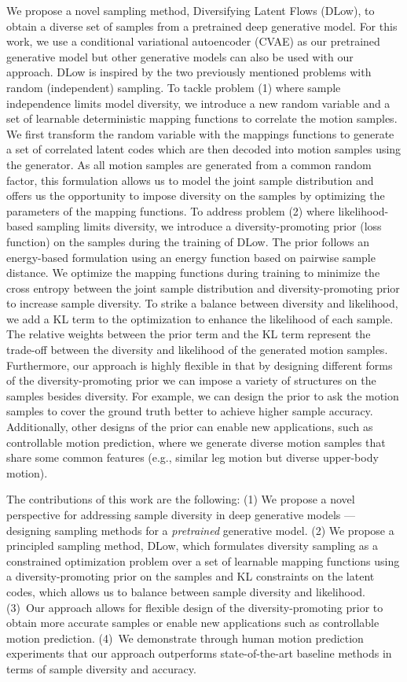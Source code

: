 \documentclass[runningheads]{llncs}
\begin{document}
	We propose a novel sampling method, Diversifying Latent Flows (DLow), to obtain a diverse set of samples from a pretrained deep generative model. For this work, we use a conditional variational autoencoder (CVAE) as our pretrained generative model but other generative models can also be used with our approach. DLow is inspired by the two previously mentioned problems with random (independent) sampling. To tackle problem (1) where sample independence limits model diversity, we introduce a new random variable and a set of learnable deterministic mapping functions to correlate the motion samples. We first transform the random variable with the mappings functions to generate a set of correlated latent codes which are then decoded into motion samples using the generator. As all motion samples are generated from a common random factor, this formulation allows us to model the joint sample distribution and offers us the opportunity to impose diversity on the samples by optimizing the parameters of the mapping functions. To address problem (2) where likelihood-based sampling limits diversity, we introduce a diversity-promoting prior (loss function) on the samples during the training of DLow. The prior follows an energy-based formulation using an energy function based on pairwise sample distance. We optimize the mapping functions during training to minimize the cross entropy between the joint sample distribution and diversity-promoting prior to increase sample diversity. To strike a balance between diversity and likelihood, we add a KL term to the optimization to enhance the likelihood of each sample. The relative weights between the prior term and the KL term represent the trade-off between the diversity and likelihood of the generated motion samples.
	Furthermore, our approach is highly flexible in that by designing different forms of the diversity-promoting prior we can impose a variety of structures on the samples besides diversity. For example, we can design the prior to ask the motion samples to cover the ground truth better to achieve higher sample accuracy. Additionally, other designs of the prior can enable new applications, such as controllable motion prediction, where we generate diverse motion samples that share some common features (e.g., similar leg motion but diverse upper-body motion).
	
	The contributions of this work are the following: 
	(1) We propose a novel perspective for addressing sample diversity in deep generative models --- designing sampling methods for a \emph{pretrained} generative model. 
	(2) We propose a principled sampling method, DLow, which formulates diversity sampling as a constrained optimization problem over a set of learnable mapping functions using a diversity-promoting prior on the samples and KL constraints on the latent codes, which allows us to balance between sample diversity and likelihood.
	(3)~Our approach allows for flexible design of the diversity-promoting prior to obtain more accurate samples or enable new applications such as controllable motion prediction. 
	(4)~We demonstrate through human motion prediction experiments that our approach outperforms state-of-the-art baseline methods in terms of sample diversity and accuracy.
	
\end{document}
